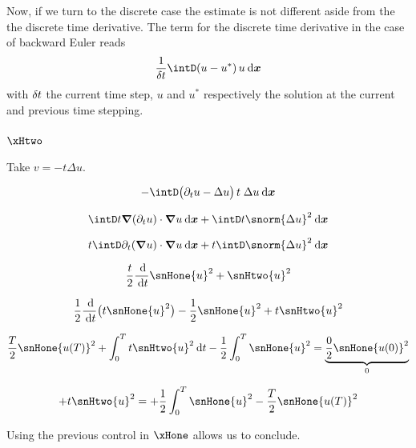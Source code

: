 \medskip
Now, if we turn to the discrete case the estimate is not different aside from the the discrete time derivative.
The term for the discrete time derivative in the case of backward Euler reads
\begin{equation*}
\dfrac{1}{\kt}\intD (u - u^\ast)\, u \dxx
\end{equation*}
with $\delta \hspace{-0.05ex} t$ the current time step, $u$ and $u^\ast$ respectively the solution at the current and previous time stepping.

\subsubsection{$\xHtwo$}

Take $v = - t \Delta u$.

\begin{equation*}
- \intD \bigl(\partial_t u - \Delta u\bigr)\,t\;\Delta u \dxx
\end{equation*}


\begin{equation*}
\intD t \Grad(\partial_t u)\cdot\Grad u  \dxx + \intD t \snorm{\Delta u}^2 \dxx
\end{equation*}

\begin{equation*}
t \intD \partial_t(\Grad u)\cdot\Grad u \dxx + t \intD \snorm{\Delta u}^2 \dxx
\end{equation*}

\begin{equation*}
\dfrac{t}{2}\dfrac{\md}{\dt}\snHone{u}^2 + \snHtwo{u}^2
\end{equation*}

\begin{equation*}
\dfrac{1}{2}\dfrac{\md}{\dt}\bigl(t \snHone{u}^2\bigr) - \dfrac{1}{2} \snHone{u}^2 + t\snHtwo{u}^2
\end{equation*}

\begin{equation*}
\dfrac{T}{2}\snHone{u(T)}^2 + \int_0^T t\snHtwo{u}^2 \dt - \dfrac{1}{2}\int_0^T \snHone{u}^2 = \underbrace{\dfrac{0}{2}\snHone{u(0)}^2}_{0}
\end{equation*}

\begin{equation*}
+ t\snHtwo{u}^2 = + \dfrac{1}{2}\int_0^T \snHone{u}^2 - \dfrac{T}{2}\snHone{u(T)}^2
\end{equation*}

Using the previous control in $\xHone$ allows us to conclude.























